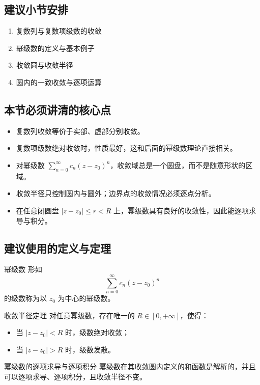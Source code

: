 \subsection*{建议小节安排}
\begin{enumerate}
    \item 复数列与复数项级数的收敛
    \item 幂级数的定义与基本例子
    \item 收敛圆与收敛半径
    \item 圆内的一致收敛与逐项运算
\end{enumerate}

\subsection*{本节必须讲清的核心点}
\begin{itemize}
    \item 复数列收敛等价于实部、虚部分别收敛。
    \item 复数项级数绝对收敛时，性质最好，这和后面的幂级数理论直接相关。
    \item 对幂级数 $\sum_{n=0}^{\infty} c_n (z-z_0)^n$，收敛域总是一个圆盘，而不是随意形状的区域。
    \item 收敛半径只控制圆内与圆外；边界点的收敛情况必须逐点分析。
    \item 在任意闭圆盘 $|z-z_0| \leq r < R$ 上，幂级数具有良好的收敛性，因此能逐项求导与积分。
\end{itemize}

\subsection*{建议使用的定义与定理}
\begin{dingliyi}{幂级数}{}
形如
\[
    \sum_{n=0}^{\infty} c_n (z-z_0)^n
\]
的级数称为以 $z_0$ 为中心的幂级数。
\end{dingliyi}

\begin{dingli}{收敛半径定理}{}
对任意幂级数，存在唯一的 $R \in [0, +\infty]$，使得：
\begin{itemize}
    \item 当 $|z-z_0| < R$ 时，级数绝对收敛；
    \item 当 $|z-z_0| > R$ 时，级数发散。
\end{itemize}
\end{dingli}

\begin{dingli}{幂级数的逐项求导与逐项积分}{}
幂级数在其收敛圆内定义的和函数是解析的，并且可以逐项求导、逐项积分，且收敛半径不变。
\end{dingli}

